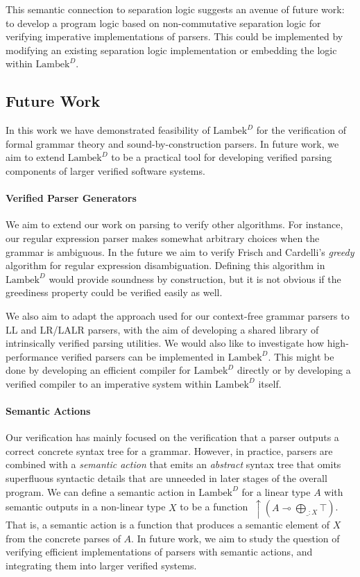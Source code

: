 \documentclass[acmsmall,nonacm]{acmart}
\newcommand{\lto}{\multimap}
\newcommand{\theoryabbv}{$\textrm{Lambek}^D$\xspace}
\newcommand{\ltonl}[1]{~\uparrow #1}
\newcommand{\LinSigTy}[3]{\textstyle\bigoplus_{#1 : #2} #3}
\newcommand{\LLL}{\textrm{LL}}
\newcommand{\LRR}{\textrm{LR}}
\newcommand{\LALRR}{\textrm{LALR}}
\begin{document}
This semantic connection to separation logic suggests an avenue of
future work: to develop a program logic based on non-commutative
separation logic for verifying imperative implementations of
parsers. This could be implemented by modifying an existing separation
logic implementation or embedding the logic within \theoryabbv.

\subsection{Future Work}
In this work we have demonstrated feasibility of \theoryabbv for the
verification of formal grammar theory and sound-by-construction parsers. In
future work, we aim to extend \theoryabbv to be a practical tool for developing
verified parsing components of larger verified software systems.

\paragraph{Verified Parser Generators}
We aim to extend our work on parsing to verify other algorithms. For instance,
our regular expression parser makes somewhat arbitrary choices
when the grammar is ambiguous. In the future we aim to verify Frisch and
Cardelli's \emph{greedy} algorithm for regular expression
disambiguation. Defining this algorithm in \theoryabbv would provide soundness
by construction, but it is not obvious if the greediness property could be
verified easily as well.

We also aim to adapt the approach used for our context-free grammar parsers to
$\LLL$ and $\LRR$/$\LALRR$ parsers, with the aim of developing a shared library
of intrinsically verified parsing utilities.
We would also like to investigate how high-performance verified parsers
can be implemented in \theoryabbv. This might be done by developing an efficient
compiler for \theoryabbv directly or by developing a verified compiler to an
imperative system within \theoryabbv itself.

\paragraph{Semantic Actions}

Our verification has mainly focused on the verification that a parser outputs a
correct concrete syntax tree for a grammar. However, in practice, parsers are
combined with a \emph{semantic action} that emits an \emph{abstract} syntax tree
that omits superfluous syntactic details that are unneeded in later stages of
the overall program. We can define a semantic action in \theoryabbv for a linear
type $A$ with semantic outputs in a non-linear type $X$ to be a function $\ltonl
{(A \lto \LinSigTy{\_}{X}{\top})}$. That is, a semantic action is a function that
produces a semantic element of $X$ from the concrete parses of $A$. In future
work, we aim to study the question of verifying efficient implementations of
parsers with semantic actions, and integrating them into larger verified
systems.
\end{document}
